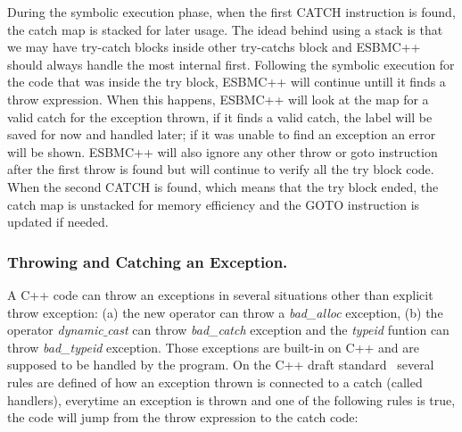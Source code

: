 \documentclass[a4paper]{llncs}
\begin{document}
During the symbolic execution phase, when the first
CATCH instruction is found, the catch map is stacked
for later usage. The idead behind using a stack is
that we may have try-catch blocks inside other
try-catchs block and ESBMC++ should always handle
the most internal first. Following the symbolic execution
for the code that was inside the try block, ESBMC++ will continue
untill it finds a throw expression. When this happens, ESBMC++ will
look at the map for a valid catch for the exception thrown, if it finds
a valid catch, the label will be saved for now and handled later;
if it was unable to find an exception an error will be shown.
ESBMC++ will also ignore any other throw or goto instruction after
the first throw is found but will continue to verify all the try
block code. When the second CATCH is found, which means that the try
block ended, the catch map is unstacked for memory efficiency
and the GOTO instruction is updated if needed.

\subsubsection{Throwing and Catching an Exception.}
A C++ code can throw an exceptions in several situations other
than explicit throw exception: (a) the new operator can throw a \textit{bad\_alloc}
exception, (b) the operator \textit{dynamic$\_$cast} can throw \textit{bad\_catch}
exception and the \textit{typeid} funtion can throw \textit{bad\_typeid} exception.
Those exceptions are built-in on C++ and are supposed to be handled by the program.
On the C++ draft standard~\cite{CppDraft} several rules are defined of how an exception
thrown is connected to a catch (called handlers), everytime an exception is thrown and
one of the following rules is true, the code will jump from the throw expression to the catch code:
\end{document}

